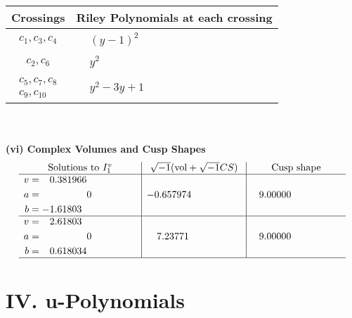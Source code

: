 \documentclass[1p]{elsarticle_modified}
\theoremstyle{definition}
\newcommand{\I}{\sqrt{-1}}
\begin{document}
\begin{tabular}{m{50pt}|m{274pt}}
Crossings & \hspace{64pt}Riley Polynomials at each crossing \\
\hline $$\begin{aligned}c_{1},c_{3},c_{4}\end{aligned}$$&$\begin{aligned}
&(y-1)^2
\end{aligned}$\\
\hline $$\begin{aligned}c_{2},c_{6}\end{aligned}$$&$\begin{aligned}
&y^2
\end{aligned}$\\
\hline $$\begin{aligned}c_{5},c_{7},c_{8}\\c_{9},c_{10}\end{aligned}$$&$\begin{aligned}
&y^2-3 y+1
\end{aligned}$\\
\hline
\end{tabular}\\~\\
\newpage\flushleft \textbf{(vi) Complex Volumes and Cusp Shapes}
$$\begin{array}{c|c|c}  
\text{Solutions to }I^v_{1}& \I (\text{vol} + \sqrt{-1}CS) & \text{Cusp shape}\\
 \hline 
\begin{aligned}
v &= \phantom{-}0.381966\phantom{ +0.000000I} \\
a &= \phantom{-0.000000 } 0 \\
b &= -1.61803\phantom{ +0.000000I}\end{aligned}
 & -0.657974\phantom{ +0.000000I} & \phantom{-}9.00000\phantom{ +0.000000I} \\ \hline\begin{aligned}
v &= \phantom{-}2.61803\phantom{ +0.000000I} \\
a &= \phantom{-0.000000 } 0 \\
b &= \phantom{-}0.618034\phantom{ +0.000000I}\end{aligned}
 & \phantom{-}7.23771\phantom{ +0.000000I} & \phantom{-}9.00000\phantom{ +0.000000I}\\
 \hline 
 \end{array}$$\newpage
\newpage\renewcommand{\arraystretch}{1}
\centering \section*{ IV. u-Polynomials}
\end{document}
